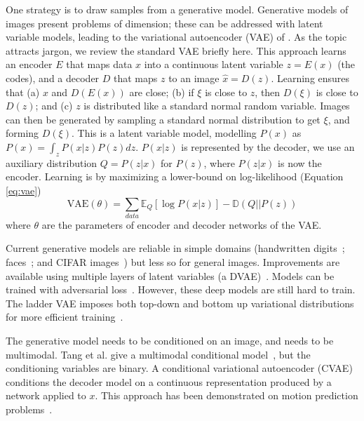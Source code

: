 \documentclass[10pt,twocolumn,letterpaper]{article}
\begin{document}
One strategy is to draw samples from a generative model.  Generative models of images present problems of dimension;
these can be addressed with latent variable models, leading to the variational autoencoder (VAE) of
\cite{kingma2013auto}.   As the topic attracts jargon, we review the standard VAE briefly here. This approach learns an
encoder $E$ that maps data $x$ into a continuous latent variable $z=E(x)$ (the codes), and a decoder $D$ that maps $z$ to
an image $\hat{x}=D(z)$.  Learning ensures that (a) $x$ and $D(E(x))$ are close; (b) if $\xi$ is close to $z$, then
$D(\xi)$ is close to $D(z)$; and (c) $z$ is distributed like a standard normal random variable.   Images can then be
generated by sampling a standard normal distribution to get $\xi$, and forming $D(\xi)$.  This is a 
latent variable model, modelling $P(x)$ as $P(x) = \int_z P(x|z)P(z)dz$. $P(x|z)$ is represented by the decoder,
we use an auxiliary distribution $Q = P(z|x)$ for $P(z)$, where $P(z|x)$ is now the encoder.  Learning is by maximizing a 
lower-bound on log-likelihood (Equation \ref{eq:vae}) 
\begin{equation}
\mbox{VAE}(\theta) = \sum_{data}\mathbb{E}_Q [\log P(x|z)] - \mathbb{D}(Q || P(z))
\label{eq:vae}
\end{equation}
where $\theta$ are the parameters of encoder and decoder networks of the VAE.


Current generative models are reliable in simple domains (handwritten digits~\cite{kingma2013auto, salimans2015markov};
faces~\cite{kingma2013auto, kulkarni2015deep, rezende2014stochastic}; and CIFAR images~\cite{gregor2015draw}) but less
so for general images.  Improvements are available using multiple layers of latent variables (a
DVAE)~\cite{rezende2014stochastic}. Models can be trained with adversarial loss~\cite{radford2015unsupervised}. However, these deep
models are still hard to train. The ladder VAE imposes both top-down and bottom up  variational distributions for more
efficient training~\cite{sonderby2016ladder}. 

The generative model needs to be conditioned on an image, and needs to be multimodal. Tang et al. give a multimodal conditional
model~\cite{tang2013learning}, but the conditioning variables are binary. A conditional variational autoencoder
(CVAE)~\cite{sohn2015learning} conditions the decoder model on a continuous representation produced by a network applied to $x$.
This approach has been demonstrated on motion prediction problems~\cite{walker2016uncertain,zhou2016learning}. 
\end{document}
